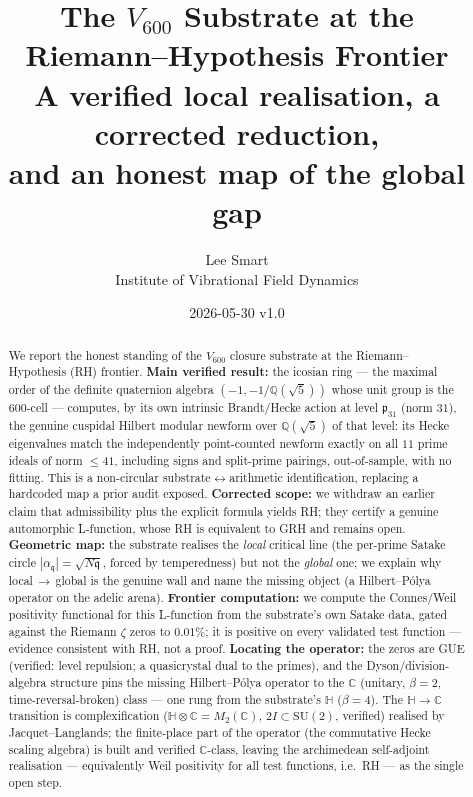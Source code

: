 \documentclass[11pt,a4paper]{article}
\title{\textbf{The $V_{600}$ Substrate at the Riemann--Hypothesis Frontier}\\
\large A verified local realisation, a corrected reduction,\\ and an honest map of the global gap}
\author{Lee Smart \\ \small Institute of Vibrational Field Dynamics}
\date{2026-05-30 \quad v1.0}
\theoremstyle{definition}
\newcommand{\Q}{\mathbb{Q}}
\newcommand{\C}{\mathbb{C}}
\begin{document}
\maketitle

\begin{center}
\end{center}

\begin{abstract}
We report the honest standing of the $V_{600}$ closure substrate at the
Riemann--Hypothesis (RH) frontier. \textbf{Main verified result:} the
icosian ring --- the maximal order of the definite quaternion algebra
$(-1,-1/\Q(\sqrt5))$ whose unit group is the $600$-cell --- computes, by its
own intrinsic Brandt/Hecke action at level $\mathfrak{p}_{31}$ (norm $31$),
the genuine cuspidal Hilbert modular newform over $\Q(\sqrt5)$ of that level:
its Hecke eigenvalues match the independently point-counted newform exactly
on all $11$ prime ideals of norm $\le 41$, including signs and split-prime
pairings, out-of-sample, with no fitting. This is a non-circular
substrate$\leftrightarrow$arithmetic identification, replacing a hardcoded
map a prior audit exposed. \textbf{Corrected scope:} we withdraw an earlier
claim that admissibility plus the explicit formula yields RH; they certify a
genuine automorphic L-function, whose RH is equivalent to GRH and remains
open. \textbf{Geometric map:} the substrate realises the \emph{local}
critical line (the per-prime Satake circle $|\alpha_\mathfrak{q}|=\sqrt{N\mathfrak{q}}$,
forced by temperedness) but not the \emph{global} one; we explain why
local$\,\to\,$global is the genuine wall and name the missing object (a
Hilbert--Pólya operator on the adelic arena). \textbf{Frontier computation:}
we compute the Connes/Weil positivity functional for this L-function from the
substrate's own Satake data, gated against the Riemann $\zeta$ zeros to
$0.01\%$; it is positive on every validated test function --- evidence
consistent with RH, not a proof. \textbf{Locating the operator:} the zeros
are GUE (verified: level repulsion; a quasicrystal dual to the primes), and
the Dyson/division-algebra structure pins the missing Hilbert--Pólya operator
to the $\C$ (unitary, $\beta=2$, time-reversal-broken) class --- one rung
from the substrate's $\mathbb{H}$ ($\beta=4$). The $\mathbb{H}\to\C$
transition is complexification ($\mathbb{H}\otimes\C=M_2(\C)$,
$2I\subset\mathrm{SU}(2)$, verified) realised by Jacquet--Langlands; the
finite-place part of the operator (the commutative Hecke scaling algebra) is
built and verified $\C$-class, leaving the archimedean self-adjoint
realisation --- equivalently Weil positivity for all test functions, i.e.\
RH --- as the single open step.
\end{abstract}
\end{document}
